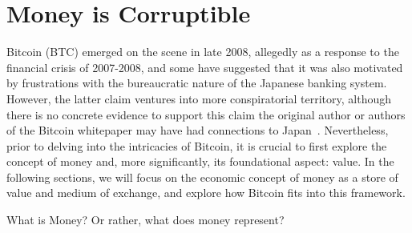 \section{Money is Corruptible}
Bitcoin (BTC) emerged on the scene in late 2008, allegedly as a response to the financial crisis of 2007-2008, and some have suggested that it was also
motivated by frustrations with the bureaucratic nature of the Japanese banking system. However, the latter claim ventures into more conspiratorial
territory, although there is no concrete evidence to support this claim the original author or authors of the Bitcoin whitepaper may have had connections
to Japan~\cite{nakamoto2008bitcoin}. Nevertheless, prior to delving into the intricacies of Bitcoin, it is crucial to first explore the concept of money
and, more significantly, its foundational aspect: value. In the following sections, we will focus on the economic concept of money as a store of value and
medium of exchange, and explore how Bitcoin fits into this framework.

What is Money? Or rather, what does money represent?



